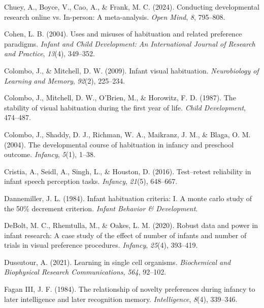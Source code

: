 \documentclass[10pt, letterpaper]{article}
\newenvironment{CSLReferences}%
  {}%
  {\par}
\begin{document}
\begin{CSLReferences}{1}{0}
\leavevmode{}%
Chuey, A., Boyce, V., Cao, A., \& Frank, M. C. (2024). Conducting
developmental research online vs. In-person: A meta-analysis. \emph{Open
Mind}, \emph{8}, 795--808.

\leavevmode{}%
Cohen, L. B. (2004). Uses and misuses of habituation and related
preference paradigms. \emph{Infant and Child Development: An
International Journal of Research and Practice}, \emph{13}(4), 349--352.

\leavevmode{}%
Colombo, J., \& Mitchell, D. W. (2009). Infant visual habituation.
\emph{Neurobiology of Learning and Memory}, \emph{92}(2), 225--234.

\leavevmode{}%
Colombo, J., Mitchell, D. W., O'Brien, M., \& Horowitz, F. D. (1987).
The stability of visual habituation during the first year of life.
\emph{Child Development}, 474--487.

\leavevmode{}%
Colombo, J., Shaddy, D. J., Richman, W. A., Maikranz, J. M., \& Blaga,
O. M. (2004). The developmental course of habituation in infancy and
preschool outcome. \emph{Infancy}, \emph{5}(1), 1--38.

\leavevmode{}%
Cristia, A., Seidl, A., Singh, L., \& Houston, D. (2016). Test--retest
reliability in infant speech perception tasks. \emph{Infancy},
\emph{21}(5), 648--667.

\leavevmode{}%
Dannemiller, J. L. (1984). Infant habituation criteria: I. A monte carlo
study of the 50\% decrement criterion. \emph{Infant Behavior \&
Development}.

\leavevmode{}%
DeBolt, M. C., Rhemtulla, M., \& Oakes, L. M. (2020). Robust data and
power in infant research: A case study of the effect of number of
infants and number of trials in visual preference procedures.
\emph{Infancy}, \emph{25}(4), 393--419.

\leavevmode{}%
Dussutour, A. (2021). Learning in single cell organisms.
\emph{Biochemical and Biophysical Research Communications}, \emph{564},
92--102.

\leavevmode{}%
Fagan III, J. F. (1984). The relationship of novelty preferences during
infancy to later intelligence and later recognition memory.
\emph{Intelligence}, \emph{8}(4), 339--346.


\end{CSLReferences}
\end{document}
